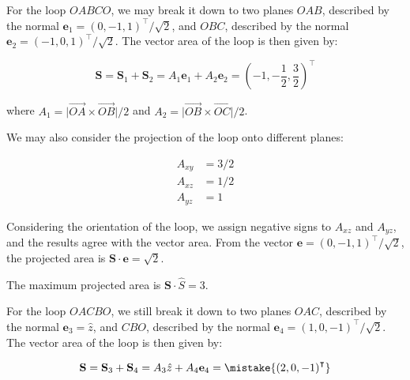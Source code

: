 \documentclass[12pt]{article}
\begin{document}



\pagebreak
\section*{}


For the loop $OABCO$, we may break it down to two planes $OAB$, described by the normal $\mathbf{e}_{1} = (0, -1, 1)^{\intercal}/\sqrt{2}$, and $OBC$, described by the normal $\mathbf{e}_{2} = (-1, 0, 1)^{\intercal}/\sqrt{2}$. The vector area of the loop is then given by:

\begin{equation}
    \mathbf{S} = \mathbf{S}_{1} + \mathbf{S}_{2} = A_{1} \mathbf{e}_{1} + A_{2} \mathbf{e}_{2} = \left( -1, -\frac{1}{2}, \frac{3}{2} \right)^{\intercal}
\end{equation}

where $A_{1} = \lvert \overrightarrow{OA} \times \overrightarrow{OB} \rvert /2$ and $A_{2} = \lvert \overrightarrow{OB} \times \overrightarrow{OC} \rvert /2$.

We may also consider the projection of the loop onto different planes:

\begin{equation}
\begin{split}
    A_{xy} &= 3/2 \\
    A_{xz} &= 1/2 \\
    A_{yz} &= 1
\end{split}
\end{equation}

Considering the orientation of the loop, we assign negative signs to $A_{xz}$ and $A_{yz}$, and the results agree with the vector area. From the vector $\mathbf{e} = (0, -1, 1)^{\intercal}/\sqrt{2}$, the projected area is $\mathbf{S} \cdot \mathbf{e} = \sqrt{2}$.

\begin{correction}
    The maximum projected area is $\mathbf{S} \cdot \hat{S} = 3$.
\end{correction}

For the loop $OACBO$, we still break it down to two planes $OAC$, described by the normal $\mathbf{e}_{3} = \hat{z}$, and $CBO$, described by the normal $\mathbf{e}_{4} = (1, 0, -1)^{\intercal}/\sqrt{2}$. The vector area of the loop is then given by:

\begin{equation}
    \mathbf{S} = \mathbf{S}_{3} + \mathbf{S}_{4} = A_{3} \hat{z} + A_{4} \mathbf{e}_{4} = \mistake{\left( 2, 0, -1 \right)^{\intercal}}
\end{equation}
\end{document}
